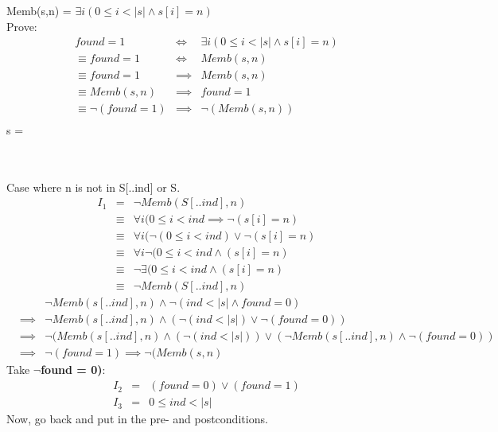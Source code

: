 \documentclass[12pt]{article}
\newcommand\abs[1]{\left|#1\right|}
\begin{document}
\noindent Memb(s,n) = $\exists i(0 \leq i < \abs{s} \land s[i] = n)$ \\
Prove: \\
\begin{eqnarray*}
found = 1 & \iff & \exists i(0 \leq i < \abs{s} \land s[i] = n) \\
\equiv found = 1 & \iff & Memb(s,n) \\
\equiv found = 1 & \implies & Memb(s,n) \\
\equiv Memb(s,n) & \implies & found = 1 \\
\equiv \neg (found = 1) & \implies & \neg (Memb(s,n)) \\
\end{eqnarray*}
s = 
\begin{tabular}[5pt]{| c | c | c | c | c | c | c | c | c |}
\hline
& & & & & & & & \\
\hline
\end{tabular} \\
Case where n is not in S[..ind] or S. \\
\begin{eqnarray*}
I_1 & = & \neg Memb(S[..ind],n) \\
 	& \equiv & \forall i (0 \leq i < ind \implies \neg(s[i] = n) \\
 	& \equiv & \forall i (\neg(0 \leq i < ind) \lor \neg(s[i] = n) \\
 	& \equiv & \forall i \neg(0 \leq i < ind \land (s[i] = n) \\
 	& \equiv & \neg \exists (0 \leq i < ind \land (s[i] = n) \\
 	& \equiv & \neg Memb(S[..ind],n) 
\end{eqnarray*}
\begin{eqnarray*}
& & \neg Memb(s[..ind], n) \land \neg(ind < \abs{s} \land found = 0) \\
& \implies & \neg Memb(s[..ind], n) \land (\neg(ind < \abs{s}) \lor \neg(found = 0)) \\
& \implies & \neg (Memb(s[..ind], n) \land (\neg(ind < \abs{s})) \lor (\neg Memb(s[..ind], n) \land \neg(found = 0)) \\
& \implies & \neg(found = 1) \implies \neg(Memb(s,n)
\end{eqnarray*}
Take $\neg$\textbf{found = 0)}:
\begin{eqnarray*}
I_2 & = & (found = 0) \lor (found = 1) \\
I_3 & = & 0 \leq ind < \abs{s}
\end{eqnarray*}
Now, go back and put in the pre- and postconditions. 
\end{document}
